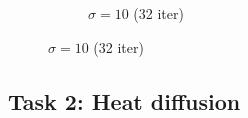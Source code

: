 \documentclass[paper=a4, fontsize=11pt]{scrartcl} %
\numberwithin{equation}{section} %
\numberwithin{figure}{section} %
\numberwithin{table}{section} %
\begin{document}
\begin{figure}[b]
\begin{subfigure}[b]{0.3\textwidth}
		\noindent{}
	\caption{$\sigma = 10$ (32 iter)}
	\end{subfigure}
\end{figure}



\subsection{Task 2: Heat diffusion}
\end{document}

